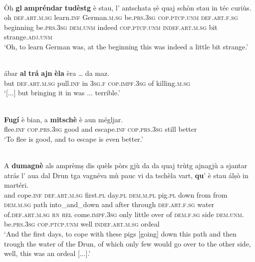 \ea
\label{ex:subjclause1}
\\
	\gll    Òh \textbf{gl} \textbf{ampréndar} \textbf{tudèstg} è stau, l’ antschata ṣè quaj schòn stau in téc curiùs.\\
oh \textsc{def.art.m.sg} learn.\textsc{inf} German.\textsc{m.sg} be.\textsc{prs.3sg}  \textsc{cop.ptcp.unm} \textsc{def.art.f.sg} beginning be.\textsc{prs.3sg} \textsc{dem.unm} indeed \textsc{cop.ptcp.unm} \textsc{indef.art.m.sg} bit strange.\textsc{adj.unm}\\
\glt `Oh, to learn German was, at the beginning this was indeed a little bit strange.'
\z

\ea
\label{ex:subjclause2}
\\
\gll [...] ábar \textbf{al} \textbf{trá} \textbf{ajn} \textbf{èla} èra … da maz.   \\
{} but \textsc{def.art.m.sg} pull.\textsc{inf} in \textsc{3sg.f} \textsc{cop.impf.3sg} {} of killing.\textsc{m.sg}\\
\glt `[...] but bringing it in was ... terrible.'
\z

\ea
\label{ex:subjclause3}
\\
\gll \textbf{Fugí} è bian, a \textbf{mitschè} è aun mégljar. \\
   flee.\textsc{inf} \textsc{cop.prs.3sg} good and escape.\textsc{inf} \textsc{cop.prs.3sg} still better  \\
\glt `To flee is good, and to escape is even better.'
\z

\ea
\label{ex:subjclause4}
\\
\gll    A \textbf{dumagnè} als amprèmṣ dis quèls pòrs gjù da da quaj trùtg ajnagjù a sjantar atrás l’ aua dal Drun tga vagnéva mù pauc vi da tschèla vart, \textbf{qu}’ è stau álṣò in martéri.\\
and cope.\textsc{inf} \textsc{def.art.m.sg} first.\textsc{pl}  day.\textsc{pl} \textsc{dem.m.pl}  pig.\textsc{pl} down from from \textsc{dem.m.sg} path into\_and\_down and after through  \textsc{def.art.f.sg} water of.\textsc{def.art.m.sg}  \textsc{rn} \textsc{rel} come.\textsc{impf.3sg} only little over of \textsc{dem.f.sg} side \textsc{dem.unm.} be.\textsc{prs.3sg} \textsc{cop.ptcp.unm} well \textsc{indef.art.m.sg} ordeal \\
\glt `And the first days, to cope with these pigs [going] down this path and then trough the water of the Drun, of which only few would go over to the other side, well, this was an ordeal [...].'
\z

